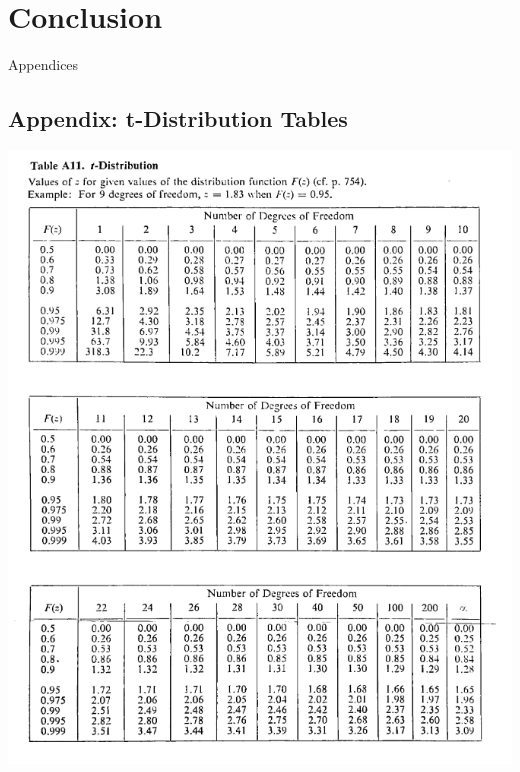 \documentclass{article}
\begin{document}
\section{Conclusion}




\newpage
\thispagestyle{empty}  %
\begin{center}
	\vspace*{\fill}
	{\Huge Appendices}
	\vspace*{\fill}
\end{center}

\newpage
\begin{appendices}
\pagestyle{fancy}
\renewcommand{\thefigure}{A\arabic{figure}}
\setcounter{figure}{0}

\section*{Appendix: t-Distribution Tables}
\includegraphics[width=\textwidth]{t_distribution_Table_lecture3.png}
\end{appendices}
\end{document}
